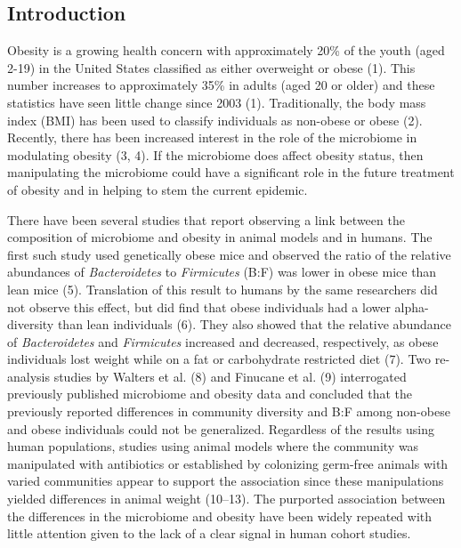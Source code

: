 \documentclass[12pt,]{article}
\begin{document}
\newpage

\subsection{Introduction}\label{introduction}

Obesity is a growing health concern with approximately 20\% of the youth
(aged 2-19) in the United States classified as either overweight or
obese (1). This number increases to approximately 35\% in adults (aged
20 or older) and these statistics have seen little change since 2003
(1). Traditionally, the body mass index (BMI) has been used to classify
individuals as non-obese or obese (2). Recently, there has been
increased interest in the role of the microbiome in modulating obesity
(3, 4). If the microbiome does affect obesity status, then manipulating
the microbiome could have a significant role in the future treatment of
obesity and in helping to stem the current epidemic.

There have been several studies that report observing a link between the
composition of microbiome and obesity in animal models and in humans.
The first such study used genetically obese mice and observed the ratio
of the relative abundances of \emph{Bacteroidetes} to \emph{Firmicutes}
(B:F) was lower in obese mice than lean mice (5). Translation of this
result to humans by the same researchers did not observe this effect,
but did find that obese individuals had a lower alpha-diversity than
lean individuals (6). They also showed that the relative abundance of
\emph{Bacteroidetes} and \emph{Firmicutes} increased and decreased,
respectively, as obese individuals lost weight while on a fat or
carbohydrate restricted diet (7). Two re-analysis studies by Walters et
al. (8) and Finucane et al. (9) interrogated previously published
microbiome and obesity data and concluded that the previously reported
differences in community diversity and B:F among non-obese and obese
individuals could not be generalized. Regardless of the results using
human populations, studies using animal models where the community was
manipulated with antibiotics or established by colonizing germ-free
animals with varied communities appear to support the association since
these manipulations yielded differences in animal weight (10--13). The
purported association between the differences in the microbiome and
obesity have been widely repeated with little attention given to the
lack of a clear signal in human cohort studies.
\end{document}
